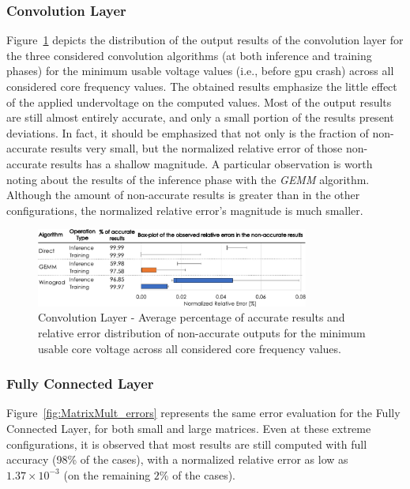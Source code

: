 \subsubsection{Convolution Layer}

Figure~\ref{fig:Convolution_errors} depicts the distribution of the output results of the convolution layer for the three considered convolution algorithms (at both inference and training phases) for the minimum usable voltage values (i.e., before \acrshort{gpu} crash) across all considered core frequency values. The obtained results emphasize the little effect of the applied undervoltage on the computed values. Most of the output results are still almost entirely accurate, and only a small portion of the results present deviations. In fact, it should be emphasized that not only is the fraction of non-accurate results very small, but the normalized relative error of those non-accurate results has a shallow magnitude. A particular observation is worth noting about the results of the inference phase with the \textit{GEMM} algorithm. Although the amount of non-accurate results is greater than in the other configurations, the normalized relative error's magnitude is much smaller.

\begin{figure}[htbp]
    \centering
        \includegraphics[width=0.8\textwidth]{Figures/Application To Deep Learning/Convolution_Error_Distribution.pdf}
        \caption{Convolution Layer - Average percentage of accurate results and relative error distribution of non-accurate outputs for the minimum usable core voltage across all considered core frequency values.}
    \label{fig:Convolution_errors}
\end{figure}



\subsubsection{Fully Connected Layer}

Figure~\ref{fig:MatrixMult_errors} represents the same error evaluation for the Fully Connected Layer, for both small and large matrices. Even at these extreme configurations, it is observed that most results are still computed with full accuracy (98\% of the cases), with a normalized relative error as low as $1.37\times10^{-3}$ (on the remaining $2$\% of the cases).

